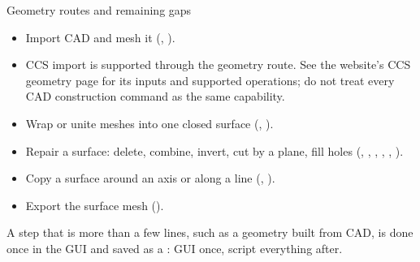 \begin{frame}{Geometry routes and remaining gaps}
\begin{itemize}\small
  \item Import CAD and mesh it (, ).
  \item CCS import is supported through the geometry route. See the website's
        CCS geometry page for its inputs and supported operations; do not treat
        every CAD construction command as the same capability.
  \item Wrap or unite meshes into one closed surface (, ).
  \item Repair a surface: delete, combine, invert, cut by a plane, fill holes (, , , , , ).
  \item Copy a surface around an axis or along a line (, ).
  \item Export the surface mesh ().
\end{itemize}
\begin{takeaway}
A step that is more than a few lines, such as a geometry built from CAD, is done once in the GUI and saved as a : GUI once, script everything after.
\end{takeaway}
\end{frame}
